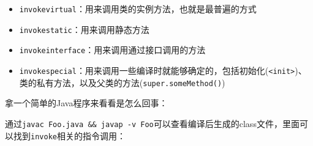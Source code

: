 \documentclass[12pt]{article}
\begin{document}
\begin{itemize}
\tightlist
\item
  \texttt{invokevirtual}：用来调用类的实例方法，也就是最普遍的方式
\item
  \texttt{invokestatic}：用来调用静态方法
\item
  \texttt{invokeinterface}：用来调用通过接口调用的方法
\item
  \texttt{invokespecial}：用来调用一些编译时就能够确定的，包括初始化(\texttt{\textless{}init\textgreater{}})、类的私有方法，以及父类的方法(\texttt{super.someMethod()})
\end{itemize}

拿一个简单的Java程序来看看是怎么回事：

\begin{Shaded}
\begin{Highlighting}[]
 \OperatorTok{\{}
       \OperatorTok{(}\OperatorTok{[]}\OperatorTok{)} \OperatorTok{\{}
        \OperatorTok{=} \OperatorTok{();}            

        \OperatorTok{\textless{}}\OperatorTok{\textgreater{}}\OperatorTok{=}   \OperatorTok{\textless{}\textgreater{}();} 
        \OperatorTok{\textless{}}\OperatorTok{\textgreater{}}\OperatorTok{=}\OperatorTok{;}

\OperatorTok{(}\OperatorTok{);}                           
\OperatorTok{(}\OperatorTok{);}                                
    \OperatorTok{\}}
\OperatorTok{\}}
\end{Highlighting}
\end{Shaded}

通过\texttt{javac\ Foo.java\ \&\&\ javap\ -v\ Foo}可以查看编译后生成的class文件，里面可以找到\texttt{invoke}相关的指令调用：
\end{document}
